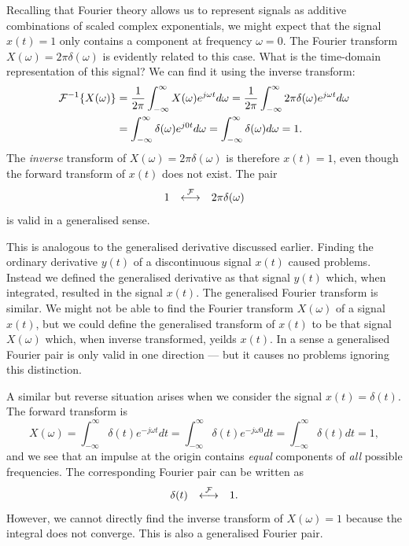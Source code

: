 \documentclass[10pt]{beamer}
\newcommand{\ftpair}{{\stackrel{\cal F}{\longleftrightarrow}}}
\begin{document}
Recalling that Fourier theory allows us to represent signals as additive combinations of scaled complex exponentials, we might expect that the signal $x(t) = 1$ only contains a component at frequency $\omega = 0$.  The Fourier transform $X(\omega) = 2 \pi \delta(\omega)$ is evidently related to this case.  What is the time-domain representation of this signal?  We can find it using the inverse transform:
\begin{align*}
  {\cal F}^{-1}\{X(\omega)\} &= \frac{1}{2 \pi} \int_{-\infty}^{\infty} X(\omega) e^{j \omega t} d\omega
  = \frac{1}{2 \pi} \int_{-\infty}^{\infty} 2 \pi \delta(\omega) e^{j \omega t} d\omega \\
  &= \int_{-\infty}^{\infty} \delta(\omega) e^{j 0 t} d\omega
  = \int_{-\infty}^{\infty} \delta(\omega) d\omega = 1.
\end{align*}
The {\em inverse} transform of $X(\omega) = 2 \pi \delta(\omega)$ is therefore $x(t) = 1$, even though the forward transform of $x(t)$ does not exist.  The pair
\begin{equation*}
  1 \quad \ftpair \quad 2 \pi \delta(\omega)
\end{equation*}
is valid in a generalised sense. 

This is analogous to the generalised derivative discussed earlier.  Finding the ordinary derivative $y(t)$ of a discontinuous signal $x(t)$ caused problems.  Instead we defined the generalised derivative as that signal $y(t)$ which, when integrated, resulted in the signal $x(t)$.  The generalised Fourier transform is similar.  We might not be able to find the Fourier transform $X(\omega)$ of a signal $x(t)$, but we could define the generalised transform of $x(t)$ to be that signal $X(\omega)$ which, when inverse transformed, yeilds $x(t)$.  In a sense a generalised Fourier pair is only valid in one direction --- but it causes no problems ignoring this distinction.

A similar but reverse situation arises when we consider the signal $x(t) = \delta(t)$.  The forward transform is 
\begin{equation*}
  X(\omega) = \int_{-\infty}^{\infty} \delta(t) e^{-j \omega t} dt
  = \int_{-\infty}^{\infty} \delta(t) e^{-j \omega 0} dt 
  = \int_{-\infty}^{\infty} \delta(t) dt = 1,
\end{equation*}
and we see that an impulse at the origin contains {\em equal} components of {\em all} possible frequencies.  The corresponding Fourier pair can be written as
\begin{equation*}
  \delta(t) \quad \ftpair \quad 1.
\end{equation*}
However, we cannot directly find the inverse transform of $X(\omega) = 1$ because the integral does not converge.  This is also a generalised Fourier pair.
\end{document}
